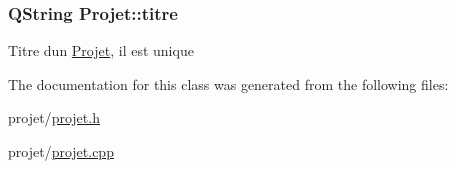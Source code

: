 \subsubsection[{titre}]{\setlength{\rightskip}{0pt plus 5cm}Q\+String Projet\+::titre\hspace{0.3cm}{\ttfamily [private]}}\label{class_projet_a9759849c856c2ac63f94751b876fd289}
Titre d\textquotesingle{}un \hyperlink{class_projet}{Projet}, il est unique 

The documentation for this class was generated from the following files\+:\begin{DoxyCompactItemize}
\item 
projet/\hyperlink{projet_8h}{projet.\+h}\item 
projet/\hyperlink{projet_8cpp}{projet.\+cpp}\end{DoxyCompactItemize}

